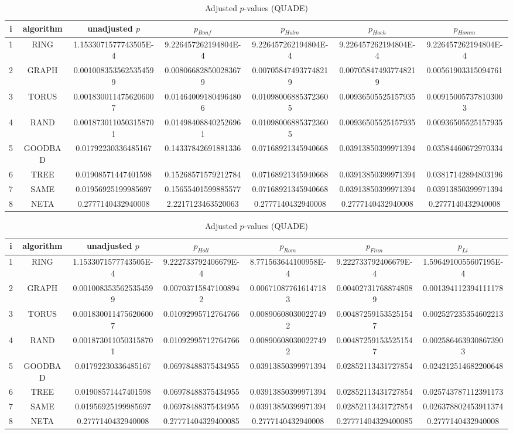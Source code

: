 \documentclass[a4paper,10pt]{article}
\begin{document}
\begin{landscape}
\begin{table}[!htp]
\centering\scriptsize
\caption{Adjusted $p$-values (QUADE)}
\begin{tabular}{ccccccc}
i&algorithm&unadjusted $p$&$p_{Bonf}$&$p_{Holm}$&$p_{Hoch}$&$p_{Homm}$\\
\hline
1& RING&1.1533071577743505E-4&9.226457262194804E-4&9.226457262194804E-4&9.226457262194804E-4&9.226457262194804E-4\\
2& GRAPH&0.0010083535625354599&0.008066828500283679&0.007058474937748219&0.007058474937748219&0.00561903315094761\\
3& TORUS&0.0018300114756206007&0.014640091804964806&0.010980068853723605&0.00936505525157935&0.009150057378103003\\
4& RAND&0.0018730110503158701&0.014984088402526961&0.010980068853723605&0.00936505525157935&0.00936505525157935\\
5& GOODBAD&0.01792230336485167&0.14337842691881336&0.07168921345940668&0.03913850399971394&0.03584460672970334\\
6& TREE&0.01908571447401598&0.15268571579212784&0.07168921345940668&0.03913850399971394&0.03817142894803196\\
7& SAME&0.01956925199985697&0.15655401599885577&0.07168921345940668&0.03913850399971394&0.03913850399971394\\
8& NETA&0.2777140432940008&2.2217123463520063&0.2777140432940008&0.2777140432940008&0.2777140432940008\\
\hline
\end{tabular}
\end{table}

\begin{table}[!htp]
\centering\scriptsize
\caption{Adjusted $p$-values (QUADE)}
\begin{tabular}{ccccccc}
i&algorithm&unadjusted $p$&$p_{Holl}$&$p_{Rom}$&$p_{Finn}$&$p_{Li}$\\
\hline
1& RING&1.1533071577743505E-4&9.222733792406679E-4&8.771563644100958E-4&9.222733792406679E-4&1.5964910055607195E-4\\
2& GRAPH&0.0010083535625354599&0.007037158471008942&0.006710877616147183&0.004027317688748089&0.001394112394111178\\
3& TORUS&0.0018300114756206007&0.01092995712764766&0.008906080300227492&0.004872591535251547&0.002527235354602213\\
4& RAND&0.0018730110503158701&0.01092995712764766&0.008906080300227492&0.004872591535251547&0.0025864639308673903\\
5& GOODBAD&0.01792230336485167&0.06978488375434955&0.03913850399971394&0.02852113431727854&0.024212514682200648\\
6& TREE&0.01908571447401598&0.06978488375434955&0.03913850399971394&0.02852113431727854&0.025743787112391173\\
7& SAME&0.01956925199985697&0.06978488375434955&0.03913850399971394&0.02852113431727854&0.026378802453911374\\
8& NETA&0.2777140432940008&0.27771404329400085&0.2777140432940008&0.27771404329400085&0.2777140432940008\\
\hline
\end{tabular}
\end{table}

\end{landscape}
\end{document}

